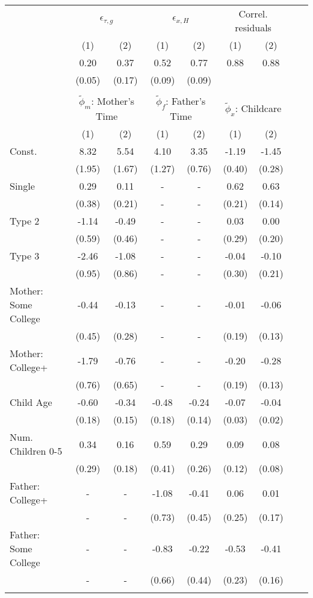 \begin{tabular}{lcccccccc}\\\toprule
 & \multicolumn{2}{c}{$\epsilon_{\tau,g}$} & \multicolumn{2}{c}{$\epsilon_{x,H}$} & \multicolumn{2}{c}{Correl. residuals}\\
&(1)&(2)&(1)&(2)&(1)&(2)\\\cmidrule(r){2-3}\cmidrule(r){4-5}\cmidrule(r){6-7}
&0.20&0.37&0.52&0.77&0.88&0.88&&\\
&(0.05)&(0.17)&(0.09)&(0.09)&&&&\\
&&&&&&\\
 & \multicolumn{2}{c}{$\tilde{\phi}_{m}$: Mother's Time} & \multicolumn{2}{c}{$\tilde{\phi}_{f}$: Father's Time} & \multicolumn{2}{c}{$\tilde{\phi}_{x}$: Childcare}\\
&(1)&(2)&(1)&(2)&(1)&(2)\\\cmidrule(r){2-3}\cmidrule(r){4-5}\cmidrule(r){6-7}
Const.&8.32&5.54&4.10&3.35&-1.19&-1.45\\
&(1.95)&(1.67)&(1.27)&(0.76)&(0.40)&(0.28)\\
Single&0.29&0.11&-&-&0.62&0.63\\
&(0.38)&(0.21)&-&-&(0.21)&(0.14)\\
Type 2&-1.14&-0.49&-&-&0.03&0.00\\
&(0.59)&(0.46)&-&-&(0.29)&(0.20)\\
Type 3&-2.46&-1.08&-&-&-0.04&-0.10\\
&(0.95)&(0.86)&-&-&(0.30)&(0.21)\\
Mother: Some College&-0.44&-0.13&-&-&-0.01&-0.06\\
&(0.45)&(0.28)&-&-&(0.19)&(0.13)\\
Mother: College+&-1.79&-0.76&-&-&-0.20&-0.28\\
&(0.76)&(0.65)&-&-&(0.19)&(0.13)\\
Child Age&-0.60&-0.34&-0.48&-0.24&-0.07&-0.04\\
&(0.18)&(0.15)&(0.18)&(0.14)&(0.03)&(0.02)\\
Num. Children 0-5&0.34&0.16&0.59&0.29&0.09&0.08\\
&(0.29)&(0.18)&(0.41)&(0.26)&(0.12)&(0.08)\\
Father: College+&-&-&-1.08&-0.41&0.06&0.01\\
&-&-&(0.73)&(0.45)&(0.25)&(0.17)\\
Father: Some College&-&-&-0.83&-0.22&-0.53&-0.41\\
&-&-&(0.66)&(0.44)&(0.23)&(0.16)\\
\\
\bottomrule\end{tabular}